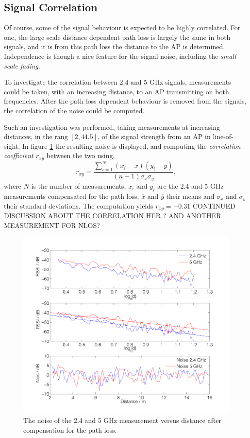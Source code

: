 \documentclass{LTHthesis}
\begin{document}
\subsection{Signal Correlation}
%
Of course, some of the signal behaviour is expected to be highly correlated. For one, the large scale distance dependent path loss is largely the same in both signals, and it is from this path loss the distance to the AP is determined. Independence is though a nice feature for the signal noise, including the \emph{small scale fading}. 

To investigate the correlation between 2.4 and 5 GHz signals, measurements could be taken, with an increasing distance, to an AP transmitting on both frequencies. After the path loss dependent behaviour is removed from the signals, the correlation of the noise could be computed.  

Such an investigation was performed, taking measurements at increasing distances, in the rang $[2,44.5]$, of the signal strength from an AP in line-of-sight. In figure \ref{noise_corr_los} the resulting noise is displayed, and computing the \emph{correlation coefficient $r_{xy}$} between the two using,
\begin{equation}
r_{xy}=\frac{\sum\limits_{i=1}^{N}{(x_i-\bar{x})(y_i-\bar{y})}}{(n-1)\sigma_x\sigma_y},
\end{equation}
where $N$ is the number of measurements, $x_i$ and $y_i$ are the 2.4 and 5 GHz measurements compensated for the path loss, $\bar x$ and $\bar y$ their means and $\sigma_x$ and $\sigma_y$ their standard deviations. The computation yields $r_{xy}=-0.31$ CONTINUED DISCUSSION ABOUT THE CORRELATION HER ? AND ANOTHER MEASUREMENT FOR NLOS? 
%
\begin{figure}[!hbt]

\includegraphics[width=1\textwidth ]{images/wifi/noise_corr_los}
\caption{The noise of the 2.4 and 5 GHz measurement versus distance after compensation for the path loss.}\label{noise_corr_los}
\end{figure}
%
\end{document}
